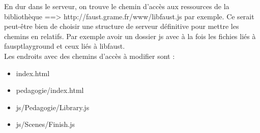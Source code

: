 \documentclass[a4paper]{article}
\begin{document}
En dur dans le serveur, on trouve le chemin d'accès aux ressources de la bibliothèque ==> http://faust.grame.fr/www/libfaust.js par exemple. Ce serait peut-être bien de choisir une structure de serveur définitive pour mettre les chemins en relatifs. Par exemple avoir un dossier js avec à la fois les fichies liés à fausptlayground et ceux liés à libfaust. \\

Les endroits avec des chemins d'accès à modifier sont :
\begin{itemize}
\item index.html
\item pedagogie/index.html
\item js/Pedagogie/Library.js
\item js/Scenes/Finish.js
\end{itemize}
\end{document}
